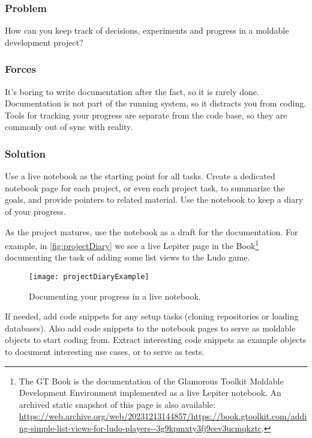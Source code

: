 \documentclass[sigconf]{acmart}
\renewcommand{\nbc}[3]{} %
\newcommand\eog[1]{\nbc{Edward}{#1}{purple}}
\newcommand{\GT}{\lst{GT}\xspace} %
\begin{document}
\subsubsection*{Problem}
How can you keep track of decisions, experiments and progress in a moldable development project?

\subsubsection*{Forces}
It's boring to write documentation after the fact, so it is rarely done.
Documentation is not part of the running system, so it distracts you from coding.
Tools for tracking your progress are separate from the code base, so they are commonly out of sync with reality.

\subsubsection*{Solution}
Use a live notebook as the starting point for all tasks.
Create a dedicated notebook page for each project, or even each project task, to summarize the goals, and provide pointers to related material.
Use the notebook to keep a diary of your progress.

As the project matures, use the notebook as a draft for the documentation.
For example, in \autoref{fig:projectDiary} we see a live Lepiter page in the \GT Book\footnote{The GT Book is the documentation of the Glamorous Toolkit Moldable Development Environment implemented as a live Lepiter notebook. An archived static snapshot of this page is also available: \url{https://web.archive.org/web/20231213144857/https://book.gtoolkit.com/adding-simple-list-views-for-ludo-players--3g9kpmxty3fj9eev3ucmqkztc}.} documenting the task of adding some list views to the Ludo game.

\eog{``Using a live notebook.'' I know folks maybe in like Jupiter like Python stuff but specific kind of like scientific Python are used to using this word or this phrase, but I would explain it or define it if you can, if you if you have the space.}

\begin{figure}[h]
  \texttt{[image: projectDiaryExample]}
  \caption{Documenting your progress in a live notebook.}
  \label{fig:projectDiary}
\end{figure}

If needed, add code snippets for any setup tasks (\eg cloning repositories or loading databases).
Also add code snippets to the notebook pages to serve as moldable objects to start coding from.
Extract interesting code snippets as example objects to document interesting use cases, or to serve as tests.
\end{document}
